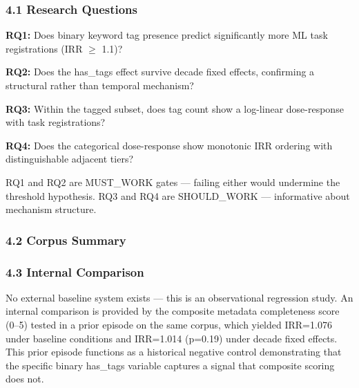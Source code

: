 
\subsubsection{4.1 Research Questions}

\textbf{RQ1:} Does binary keyword tag presence predict significantly more ML task registrations (IRR $\geq$ 1.1)?

\textbf{RQ2:} Does the has\_tags effect survive decade fixed effects, confirming a structural rather than temporal mechanism?

\textbf{RQ3:} Within the tagged subset, does tag count show a log-linear dose-response with task registrations?

\textbf{RQ4:} Does the categorical dose-response show monotonic IRR ordering with distinguishable adjacent tiers?

RQ1 and RQ2 are MUST\_WORK gates --- failing either would undermine the threshold hypothesis. RQ3 and RQ4 are SHOULD\_WORK --- informative about mechanism structure.

\subsubsection{4.2 Corpus Summary}

\begin{table}[htbp]
\centering
{}
\end{table}

\subsubsection{4.3 Internal Comparison}

No external baseline system exists --- this is an observational regression study. An internal comparison is provided by the composite metadata completeness score (0--5) tested in a prior episode on the same corpus, which yielded IRR=1.076 under baseline conditions and IRR=1.014 (p=0.19) under decade fixed effects. This prior episode functions as a historical negative control demonstrating that the specific binary has\_tags variable captures a signal that composite scoring does not.

